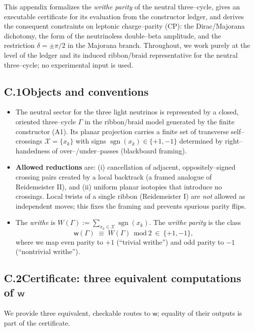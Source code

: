 \documentclass[11pt]{article}
\begin{document}
This appendix formalizes the \emph{writhe parity} of the neutral three–cycle, gives an executable certificate for its evaluation from the constructor ledger, and derives the consequent constraints on leptonic charge–parity (CP): the Dirac/Majorana dichotomy, the form of the neutrinoless double–beta amplitude, and the restriction $\delta=\pm\pi/2$ in the Majorana branch. Throughout, we work purely at the level of the ledger and its induced ribbon/braid representative for the neutral three–cycle; no experimental input is used.

\subsection*{C.1\quad Objects and conventions}

\begin{itemize}
  \item The neutral sector for the three light neutrinos is represented by a closed, oriented three–cycle $\Gamma$ in the ribbon/braid model generated by the finite constructor (A1). Its planar projection carries a finite set of transverse self–crossings $\mathcal{X}=\{x_k\}$ with signs $\operatorname{sgn}(x_k)\in\{+1,-1\}$ determined by right–handedness of over–/under–passes (blackboard framing).
  \item \textbf{Allowed reductions} are: (i) cancellation of adjacent, oppositely–signed crossing pairs created by a local backtrack (a framed analogue of Reidemeister II), and (ii) uniform planar isotopies that introduce no crossings. Local twists of a single ribbon (Reidemeister I) are \emph{not} allowed as independent moves; this fixes the framing and prevents spurious parity flips.
  \item The \emph{writhe} is $W(\Gamma):=\sum_{x_k\in\mathcal{X}} \operatorname{sgn}(x_k)$. The \emph{writhe parity} is the class
  \[
  \mathsf{w}(\Gamma)\;\equiv\; W(\Gamma)\ \ \text{mod}\ 2\ \in\ \{+1,-1\},
  \]
  where we map even parity to $+1$ (``trivial writhe'') and odd parity to $-1$ (``nontrivial writhe'').
\end{itemize}

\subsection*{C.2\quad Certificate: three equivalent computations of $\mathsf{w}$}

We provide three equivalent, checkable routes to $\mathsf{w}$; equality of their outputs is part of the certificate.
\end{document}
